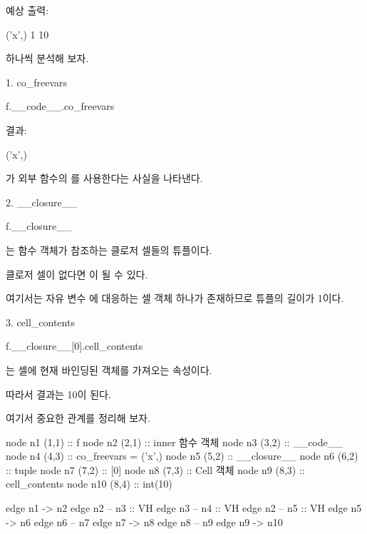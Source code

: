 예상 출력:

\begin{dhkzsh}
('x',)
1
10
\end{dhkzsh}

하나씩 분석해 보자.

\begin{dhknote}
\begin{dhksmry}[centered]
1. co_freevars
\end{dhksmry}
\end{dhknote}

\begin{dhkcode}
f.__code__.co_freevars
\end{dhkcode}

결과:

\begin{dhkzsh}
('x',)
\end{dhkzsh}

가 외부 함수의 를 사용한다는 사실을 나타낸다.

\begin{dhknote}
\begin{dhksmry}[centered]
2. __closure__
\end{dhksmry}
\end{dhknote}

\begin{dhkcode}
f.__closure__
\end{dhkcode}

는 함수 객체가 참조하는 클로저 셀들의 튜플이다.

클로저 셀이 없다면 이 될 수 있다.

여기서는 자유 변수 에 대응하는 셀 객체 하나가 존재하므로 튜플의 길이가 1이다.

\begin{dhknote}
\begin{dhksmry}[centered]
3. cell_contents
\end{dhksmry}
\end{dhknote}

\begin{dhkcode}
f.__closure__[0].cell_contents
\end{dhkcode}

는 셀에 현재 바인딩된 객체를 가져오는 속성이다.

따라서 결과는 10이 된다.

여기서 중요한 관계를 정리해 보자.

\begin{dhkdiagram}
node n1 (1,1) :: f
node n2 (2,1) :: inner 함수 객체
node n3 (3,2) :: __code__
node n4 (4,3) :: co_freevars = ('x',)
node n5 (5,2) :: __closure__
node n6 (6,2) :: tuple
node n7 (7,2) :: [0]
node n8 (7,3) :: Cell 객체
node n9 (8,3) :: cell_contents
node n10 (8,4) :: int(10)

edge n1 -> n2
edge n2 -- n3 :: VH
edge n3 -- n4 :: VH
edge n2 -- n5 :: VH
edge n5 -> n6
edge n6 -- n7
edge n7 -> n8
edge n8 -- n9
edge n9 -> n10
\end{dhkdiagram}

